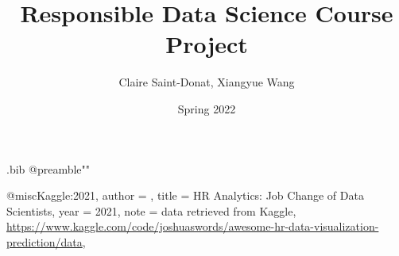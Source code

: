
\begin{filecontents*}{\jobname.bib}
@preamble{"\DeclareRobustCommand{\firstsecond}[2]{#2}"}

@misc{Kaggle:2021,
  author = {{}},
  title = {HR Analytics: Job Change of Data Scientists},
  year = {2021},
  note = {data retrieved from Kaggle, 
          \url{https://www.kaggle.com/code/joshuaswords/awesome-hr-data-visualization-prediction/data}},
}
\end{filecontents*}



\documentclass[11pt]{article}
\usepackage[top=3cm, bottom=3cm, left = 2cm, right = 2cm]{geometry}  
\usepackage[utf8]{inputenc}
\usepackage{textcomp}
\usepackage{graphicx} 
\graphicspath{ {images/} }
\usepackage{wrapfig}
\usepackage{amsmath,amssymb}  
\usepackage{bm}  
\usepackage[pdftex,bookmarks,colorlinks,breaklinks]{hyperref}  
\hypersetup{linkcolor=black,citecolor=black,filecolor=black,urlcolor=blue} %
\usepackage{memhfixc} 
\usepackage{pdfsync}  
\usepackage{fancyhdr}
\usepackage{indentfirst}
\usepackage[affil-it]{authblk}

\DeclareRobustCommand{\firstsecond}[2]{#1}

\renewcommand\Affilfont{\fontsize{9}{10.8}\itshape}
\pagestyle{fancy}

\title{Responsible Data Science Course Project}
\author{Claire Saint-Donat, Xiangyue Wang}
\date{Spring 2022}


\maketitle
\tableofcontents

\section{Introduction}

The purpose of this project is to build an interpretability tool for an Automated Decision System (ADS) which we have chosen to audit.

Automated Decision Systems are in widespread use in government and industry, and a number of efforts are currently underway to regulate them.  New York City recently passed a law (Local Law 49 of 2018) that compels the development of procedures and recommendations that City agencies should follow when explaining the operation of an ADS to the public, and demonstrating that an ADS does not discriminate against individuals based on membership in protected groups.  


